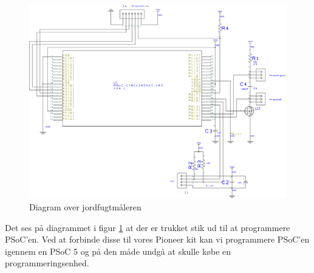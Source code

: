 \begin{figure}[H]
	\centering 
\includegraphics[scale=0.2]{HardwareArkitektur/Sensore/Jordfugt_billeder/Diagram_jordfugt.png}
	\caption{Diagram over jordfugtmåleren}
	\label{photo:Diagram_jordfugt}
\end{figure} 

Det ses på diagrammet i figur \ref{photo:Diagram_jordfugt} at der er trukket stik ud til at programmere PSoC'en. Ved at forbinde disse til vores Pioneer kit kan vi programmere PSoC'en igennem en PSoC 5 og på den måde undgå at skulle købe en programmeringsenhed. 